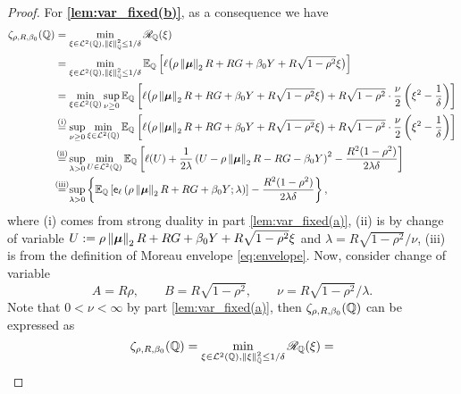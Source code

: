 \begin{proof}
    \vspace{0.5\baselineskip}
    \noindent
    For \textbf{\ref{lem:var_fixed(b)}}, as a consequence we have
    \begin{align*}
    \zeta_{\rho, R, \beta_0}(\Q) & = \min_{\xi \in \cL^2(\Q), \norm{\xi}^2_{\Q} \le 1/\delta} \mathscr{R}_{\Q}(\xi) 
    \\
    & = \min_{\xi \in \cL^2(\Q), \norm{\xi}^2_{\Q} \le 1/\delta} \E_{\Q} \left[ \ell \bigl( \rho\norm{\vmu}_2 R + RG + \beta_0 Y + R\sqrt{1 - \rho^2} \xi \bigr) \right] \\
    & = \min_{\xi \in \cL^2(\Q)} \sup_{\nu \ge 0} \E_{\Q} \left[ \ell \bigl( \rho\norm{\vmu}_2 R + RG + \beta_0 Y + 
    R\sqrt{1 - \rho^2}\xi \bigr) + R\sqrt{1 - \rho^2} \cdot \frac{\nu}{2} \left( \xi^2 - \frac{1}{\delta} \right) \right] \\
    & \stackrel{\mathmakebox[0pt][c]{\smash{\text{(i)}}}}{=} 
    \sup_{\nu \ge 0} \min_{\xi \in \cL^2(\Q)} \E_{\Q} \left[ \ell \bigl( \rho\norm{\vmu}_2 R + RG + \beta_0 Y + 
    R\sqrt{1 - \rho^2}\xi \bigr) + R\sqrt{1 - \rho^2} \cdot \frac{\nu}{2} \left( \xi^2 - \frac{1}{\delta} \right) \right] \\
    & \stackrel{\mathmakebox[0pt][c]{\smash{\text{(ii)}}}}{=} 
    \sup_{\lambda > 0} \min_{U \in \cL^2(\Q)} \E_{\Q} \left[ \ell ( U ) + \frac{1}{2 \lambda} \left( U - \rho\norm{\vmu}_2 R - RG - \beta_0 Y \right)^2 - \frac{R^2 (1 - \rho^2)}{2 \lambda \delta} \right] \\
    & \stackrel{\mathmakebox[0pt][c]{\smash{\text{(iii)}}}}{=}
    \sup_{\lambda > 0} \left\{ \E_{\Q} \left[ \envelope_{\ell} \left( \rho\norm{\vmu}_2 R + RG + \beta_0 Y; \lambda \right) \right] - \frac{R^2 (1 - \rho^2)}{2 \lambda \delta} \right\},
\end{align*}
where (i) comes from strong duality in part \ref{lem:var_fixed(a)}, (ii) is by change of variable $U := \rho\left\|{{\boldsymbol{\mu}}}\right\|_2 R + RG + \beta_0 Y + R\sqrt{1 - \rho^2} \xi$ and $\lambda = R\sqrt{1 - \rho^2}/\nu$, (iii) is from the definition of Moreau envelope \cref{eq:envelope}. Now, consider change of variable
\begin{equation*}
    A = R \rho, \qquad
    B = R \sqrt{1 - \rho^2}, \qquad
    \nu = R \sqrt{1 - \rho^2}/\lambda.
\end{equation*}
Note that $0 < \nu < \infty$ by part \ref{lem:var_fixed(a)}, then $\zeta_{\rho, R, \beta_0}(\mathbb{Q})$ can be expressed as
\begin{equation*}
    \zeta_{\rho, R, \beta_0}(\Q) = 
    \min_{\xi \in \cL^2(\Q), \norm{\xi}^2_{\Q} \le 1/\delta} \mathscr{R}_{\Q}(\xi)  = 

\end{equation*}
\end{proof}
